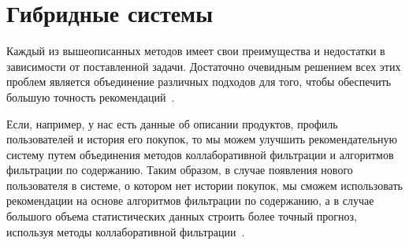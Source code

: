 %
%
%
%
%
%
%

\section{Гибридные системы}

Каждый из вышеописанных методов имеет свои преимущества и недостатки в
зависимости от поставленной задачи. Достаточно очевидным
решением всех этих проблем является объединение различных подходов
для того, чтобы обеспечить большую точность рекомендаций~\cite{kut_rec}.

Если, например, у нас есть данные об описании продуктов, профиль
пользователей и история его покупок, то мы можем улучшить рекомендательную
систему путем объединения методов коллаборативной фильтрации
и алгоритмов фильтрации по содержанию. Таким образом, в случае появления
нового пользователя в системе, о котором нет истории
покупок, мы сможем использовать рекомендации на основе алгоритмов
фильтрации по содержанию, а в случае большого объема статистических
данных строить более точный прогноз, используя методы коллаборативной фильтрации~\cite{kut_rec}.

